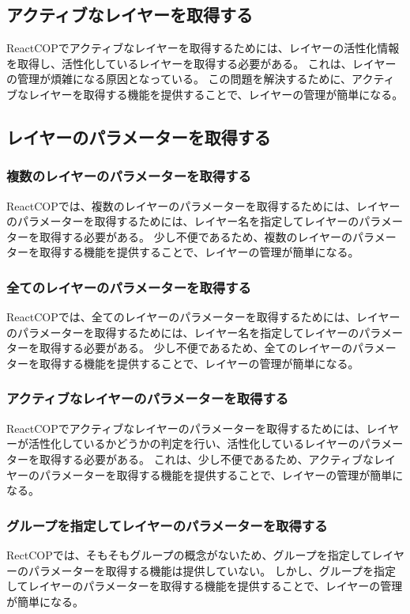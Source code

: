 \documentclass{jsarticle}
\begin{document}
\subsection{アクティブなレイヤーを取得する}
ReactCOPでアクティブなレイヤーを取得するためには、レイヤーの活性化情報を取得し、活性化しているレイヤーを取得する必要がある。
これは、レイヤーの管理が煩雑になる原因となっている。
この問題を解決するために、アクティブなレイヤーを取得する機能を提供することで、レイヤーの管理が簡単になる。


\subsection{レイヤーのパラメーターを取得する}
\subsubsection{複数のレイヤーのパラメーターを取得する}
ReactCOPでは、複数のレイヤーのパラメーターを取得するためには、レイヤーのパラメーターを取得するためには、レイヤー名を指定してレイヤーのパラメーターを取得する必要がある。
少し不便であるため、複数のレイヤーのパラメーターを取得する機能を提供することで、レイヤーの管理が簡単になる。

\subsubsection{全てのレイヤーのパラメーターを取得する}
ReactCOPでは、全てのレイヤーのパラメーターを取得するためには、レイヤーのパラメーターを取得するためには、レイヤー名を指定してレイヤーのパラメーターを取得する必要がある。
少し不便であるため、全てのレイヤーのパラメーターを取得する機能を提供することで、レイヤーの管理が簡単になる。

\subsubsection{アクティブなレイヤーのパラメーターを取得する}
ReactCOPでアクティブなレイヤーのパラメーターを取得するためには、レイヤーが活性化しているかどうかの判定を行い、活性化しているレイヤーのパラメーターを取得する必要がある。
これは、少し不便であるため、アクティブなレイヤーのパラメーターを取得する機能を提供することで、レイヤーの管理が簡単になる。

\subsubsection{グループを指定してレイヤーのパラメーターを取得する}
RectCOPでは、そもそもグループの概念がないため、グループを指定してレイヤーのパラメーターを取得する機能は提供していない。
しかし、グループを指定してレイヤーのパラメーターを取得する機能を提供することで、レイヤーの管理が簡単になる。
\end{document}
